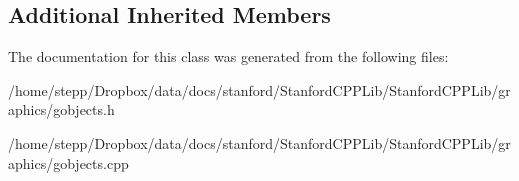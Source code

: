 \subsection*{Additional Inherited Members}


The documentation for this class was generated from the following files\+:\begin{DoxyCompactItemize}
\item 
/home/stepp/\+Dropbox/data/docs/stanford/\+Stanford\+C\+P\+P\+Lib/\+Stanford\+C\+P\+P\+Lib/graphics/gobjects.\+h\item 
/home/stepp/\+Dropbox/data/docs/stanford/\+Stanford\+C\+P\+P\+Lib/\+Stanford\+C\+P\+P\+Lib/graphics/gobjects.\+cpp\end{DoxyCompactItemize}
